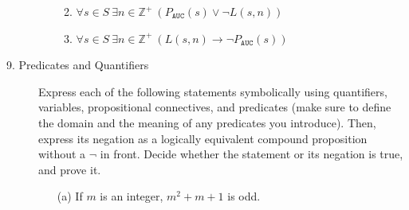 \documentclass[12pt, oneside]{article}
\newcommand{\A}[0]{\texttt{A}}
\newcommand{\C}[0]{\texttt{C}}
\newcommand{\U}[0]{\texttt{U}}
\newif \ifsolution
\newcommand{\sol}[1]{\medskip\fbox{\begin{minipage}{5.5in}{#1}\end{minipage}}\medskip}
\begin{document}
\begin{description}
\begin{enumerate}
\begin{enumerate}
\ifsolution{\sol{In English, this statement is saying that there is a positive integer that is not the length of any
RNA strand and that each RNA strand has $\A\U\C$ as a substring.  This is {\bf false}, because
when we consider any positive integer, we'll be able to find a counterexample strand that does not have $\A\U\C$
as a substring and so makes the conjunction false.
}}\fi

\item $\forall s \in S~\exists n \in \mathbb{Z}^+~ ( P_{\A\U\C}(s) \lor \lnot L(s,n) )$

\ifsolution{\sol{In English, this statement is saying that for each RNA strand we can find
some positive integer so that at least one of ``the strand has $\A\U\C$ as a substring" and ``this number
is not the length of this strand" is true. This is {\bf true}, because given any RNA strand, we can pick a witness
positive integer by choosing a number that is not its length.
}}\fi

\item $\forall s \in S~\exists n \in \mathbb{Z}^+~ (L(s,n) \to \lnot P_{\A\U\C}(s))$

\ifsolution{\sol{In English, this statement is saying that for each RNA strand, there is a witness positive integer
which makes the conditional statement ``if the RNA strand has this length then it does not have \A\U\C~as a substring" 
true. This is {\bf true}, because given any RNA strand, we can pick a witness
positive integer by choosing a number that is not its length which will make the hypothesis of the conditional statement
false and therefor the conditional will be true.
}}\fi\end{enumerate}
\end{enumerate}


  \item[9. Predicates and Quantifiers] 
  Express each of the following statements symbolically using quantifiers, variables, propositional connectives, 
  and predicates (make sure to define the domain and the meaning of any predicates 
  you introduce). Then, express its negation as a logically equivalent compound 
  proposition without a $\neg$ in front.  Decide whether the statement or its negation is true,
  and prove it.
  
  \begin{enumerate}
  \item[(a)] If $m$ is an integer, $m^2 + m +1$ is odd.
  
  \ifsolution
\end{enumerate}
\end{description}
\end{document}
